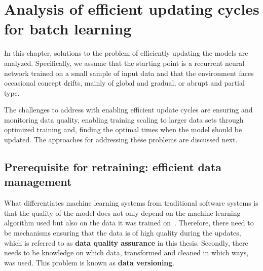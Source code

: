 

\chapter{Analysis of efficient updating cycles for batch learning}

In this chapter, solutions to the problem of efficiently updating the models are analyzed. Specifically, we assume that the starting point is a recurrent neural network trained on a small sample of input data and that the environment faces occasional concept drifts, mainly of global and gradual, or abrupt and partial type.

The challenges to address with enabling efficient update cycles are ensuring and monitoring data quality, enabling training scaling to larger data sets through optimized training and, finding the optimal times when the model should be updated. The approaches for addressing these problems are discussed next.

\section[Prerequisite for retraining: efficient data management]{Prerequisite for retraining: efficient data \\management}

What differentiates machine learning systems from traditional software systems is that the quality of the model does not only depend on the machine learning algorithm used but also on the data it was trained on~\cite{polyzotisDataLifecycleChallenges2018}. Therefore, there need to be mechanisms ensuring that the data is of high quality during the updates, which is referred to as \textbf{data quality assurance} in this thesis. Secondly, there needs to be knowledge on which data, transformed and cleaned in which ways, was used. This problem is known as \textbf{data versioning}.

